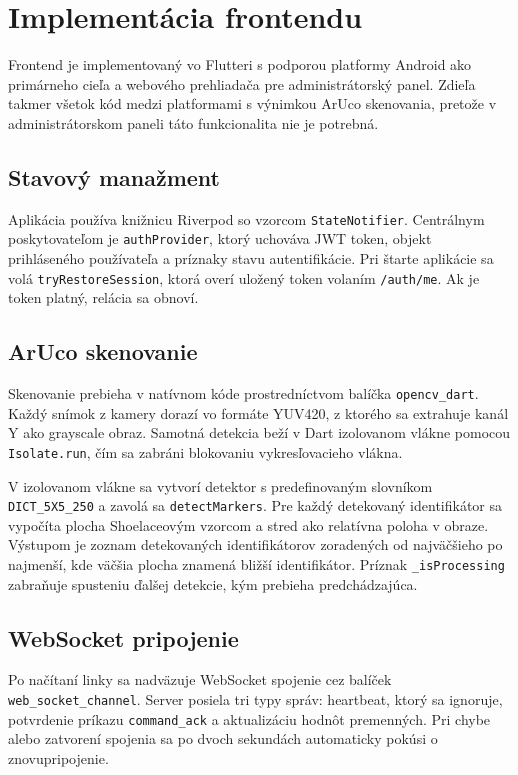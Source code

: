 \section{Implementácia frontendu}

Frontend je implementovaný vo Flutteri s podporou platformy Android ako
primárneho cieľa a webového prehliadača pre administrátorský panel. Zdieľa
takmer všetok kód medzi platformami s výnimkou ArUco skenovania, pretože v
administrátorskom paneli táto funkcionalita nie je potrebná.

\subsection{Stavový manažment}

Aplikácia používa knižnicu Riverpod so vzorcom \texttt{StateNotifier}.
Centrálnym poskytovateľom je \texttt{authProvider}, ktorý uchováva JWT token,
objekt prihláseného používateľa a príznaky stavu autentifikácie. Pri štarte
aplikácie sa volá \texttt{tryRestoreSession}, ktorá overí uložený token volaním
\texttt{/auth/me}. Ak je token platný, relácia sa obnoví.

\subsection{ArUco skenovanie}

Skenovanie prebieha v natívnom kóde prostredníctvom balíčka
\texttt{opencv\_dart}. Každý snímok z kamery dorazí vo formáte YUV420, z
ktorého sa extrahuje kanál Y ako grayscale obraz. Samotná detekcia beží v Dart
izolovanom vlákne pomocou \texttt{Isolate.run}, čím sa zabráni blokovaniu
vykresľovacieho vlákna.

V izolovanom vlákne sa vytvorí detektor s predefinovaným slovníkom
\texttt{DICT\_5X5\_250} a zavolá sa \texttt{detectMarkers}. Pre každý
detekovaný identifikátor sa vypočíta plocha Shoelaceovým vzorcom a stred ako
relatívna poloha v obraze. Výstupom je zoznam detekovaných identifikátorov
zoradených od najväčšieho po najmenší, kde väčšia plocha znamená bližší
identifikátor. Príznak \texttt{\_isProcessing} zabraňuje spusteniu ďalšej
detekcie, kým prebieha predchádzajúca.

\subsection{WebSocket pripojenie}

Po načítaní linky sa nadväzuje WebSocket spojenie cez balíček
\texttt{web\_socket\_channel}. Server posiela tri typy správ: heartbeat, ktorý
sa ignoruje, potvrdenie príkazu \texttt{command\_ack} a aktualizáciu hodnôt
premenných. Pri chybe alebo zatvorení spojenia sa po dvoch sekundách
automaticky pokúsi o znovupripojenie.

